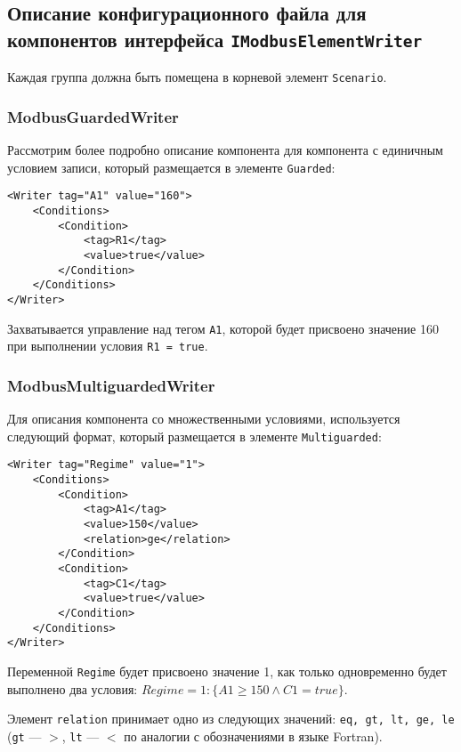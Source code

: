 \subsection{Описание конфигурационного файла для компонентов интерфейса \texttt{IModbusElementWriter}}
Каждая группа должна быть помещена в корневой элемент \texttt{Scenario}.

\subsubsection{ModbusGuardedWriter}
Рассмотрим более подробно описание компонента для компонента с единичным условием записи,
который размещается в элементе \texttt{Guarded}:
\begin{lstlisting}
<Writer tag="A1" value="160">
    <Conditions>
        <Condition>
            <tag>R1</tag>
            <value>true</value>
        </Condition>
    </Conditions>
</Writer>
\end{lstlisting}
Захватывается управление над тегом \texttt{A1}, которой будет присвоено значение 160
при выполнении условия \texttt{R1 = true}.


\subsubsection{ModbusMultiguardedWriter}
Для описания компонента со множественными условиями, используется следующий формат,
который размещается в элементе \texttt{Multiguarded}:
\begin{lstlisting}
<Writer tag="Regime" value="1">
    <Conditions>
        <Condition>
            <tag>A1</tag>
            <value>150</value>
            <relation>ge</relation>
        </Condition>
        <Condition>
            <tag>C1</tag>
            <value>true</value>
        </Condition>
    </Conditions>
</Writer>
\end{lstlisting}
Переменной \texttt{Regime} будет присвоено значение 1, как только 
одновременно будет выполнено два условия: $Regime = 1: \{A1 \ge 150 \wedge C1 = true\}$.

Элемент \texttt{relation} принимает одно из следующих значений: \texttt{eq, gt, lt, ge, le}
(\texttt{gt} --- $>$, \texttt{lt} --- $<$ по аналогии с обозначениями в языке Fortran).

